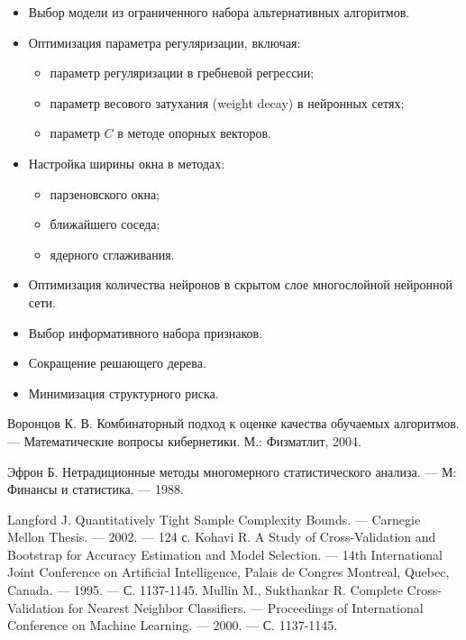 \begin{itemize}
    \item Выбор модели из ограниченного набора альтернативных алгоритмов.
    \item Оптимизация параметра регуляризации, включая:
          \begin{itemize}
              \item параметр регуляризации в гребневой регрессии;
              \item параметр весового затухания (weight decay) в нейронных сетях;
              \item параметр \( C \) в методе опорных векторов.
          \end{itemize}
    \item Настройка ширины окна в методах:
          \begin{itemize}
              \item парзеновского окна;
              \item ближайшего соседа;
              \item ядерного сглаживания.
          \end{itemize}
    \item Оптимизация количества нейронов в скрытом слое многослойной нейронной сети.
    \item Выбор информативного набора признаков.
    \item Сокращение решающего дерева.
    \item Минимизация структурного риска.
\end{itemize}

\begin{thebibliography}{5}

    Воронцов К. В. Комбинаторный подход к оценке качества обучаемых алгоритмов. — Математические вопросы кибернетики. М.: Физматлит, 2004.

    Эфрон Б. Нетрадиционные методы многомерного статистического анализа. — М: Финансы и статистика. — 1988.

    Langford J. Quantitatively Tight Sample Complexity Bounds. — Carnegie Mellon Thesis. — 2002. — 124 с.
    Kohavi R. A Study of Cross-Validation and Bootstrap for Accuracy Estimation and Model Selection. — 14th International Joint Conference on Artificial Intelligence, Palais de Congres Montreal, Quebec, Canada. — 1995. — С. 1137-1145.
    Mullin M., Sukthankar R. Complete Cross-Validation for Nearest Neighbor Classifiers. — Proceedings of International Conference on Machine Learning. — 2000. — С. 1137-1145.

\end{thebibliography}

